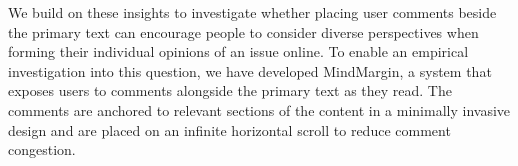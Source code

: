 We build on these insights to investigate whether placing user comments beside the primary text can encourage people to consider diverse perspectives when forming their individual opinions of an issue online. To enable an empirical investigation into this question, we have developed MindMargin, a system that exposes users to comments alongside the primary text as they read. The comments are anchored to relevant sections of the content in a minimally invasive design and are placed on an infinite horizontal scroll to reduce comment congestion.






